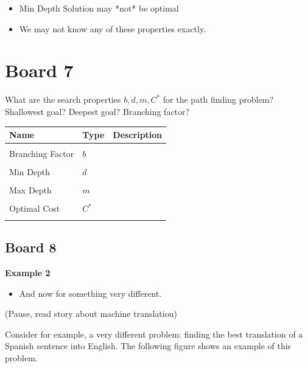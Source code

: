 \documentclass[10pt]{article}
\def\Words{
  \matrix(dict)[matrix of nodes, ampersand replacement=\&]{
    Mary \& golpeo \& la \& bruja \& verde \\
    ~\\
    ~\\
    Mary \& slapped \& the \& green \& witch \\ };
}
\begin{document}
\begin{itemize}
\item Min Depth Solution may *not* be optimal
\item We may not know any of these properties exactly.
\end{itemize}

\section{Board 7}
\begin{exercise}
  What are the search properties $b, d, m, C^*$ for the path finding
  problem? Shallowest goal? Deepest goal? Branching factor?
\end{exercise}

\air
\begin{center}
\begin{tabularx}{\linewidth}{llX}
  \toprule
  Name  & Type & Description \\
  \midrule
\\
 Branching Factor & $b$ & \censor{}  \\\\
 Min Depth &  $d$ & \censor{} \\\\
 Max Depth & $m$& \censor{} \\\\
 Optimal Cost & $C^*$& \censor{} \\\\
 \bottomrule
\end{tabularx}
\end{center}


\subsection{Board 8}
\textbf{Example 2}

\begin{itemize}
\item And now for something very different.
\end{itemize}

(Pause, read story about machine translation)


Consider for example, a very different problem: finding the best translation of a Spanish sentence into English. The following figure shows an example of this problem. 

\begin{figure}[h]
  \centering
  \label{fig:mt}
\end{figure}
\end{document}
